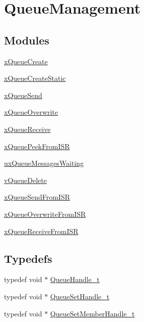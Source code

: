 \hypertarget{group___queue_management}{}\section{Queue\+Management}
\label{group___queue_management}
\subsection*{Modules}
\begin{DoxyCompactItemize}
\item 
\hyperlink{group__x_queue_create}{x\+Queue\+Create}
\item 
\hyperlink{group__x_queue_create_static}{x\+Queue\+Create\+Static}
\item 
\hyperlink{group__x_queue_send}{x\+Queue\+Send}
\item 
\hyperlink{group__x_queue_overwrite}{x\+Queue\+Overwrite}
\item 
\hyperlink{group__x_queue_receive}{x\+Queue\+Receive}
\item 
\hyperlink{group__x_queue_peek_from_i_s_r}{x\+Queue\+Peek\+From\+I\+SR}
\item 
\hyperlink{group__ux_queue_messages_waiting}{ux\+Queue\+Messages\+Waiting}
\item 
\hyperlink{group__v_queue_delete}{v\+Queue\+Delete}
\item 
\hyperlink{group__x_queue_send_from_i_s_r}{x\+Queue\+Send\+From\+I\+SR}
\item 
\hyperlink{group__x_queue_overwrite_from_i_s_r}{x\+Queue\+Overwrite\+From\+I\+SR}
\item 
\hyperlink{group__x_queue_receive_from_i_s_r}{x\+Queue\+Receive\+From\+I\+SR}
\end{DoxyCompactItemize}
\subsection*{Typedefs}
\begin{DoxyCompactItemize}
\item 
typedef void $\ast$ \hyperlink{group___queue_management_gaaf19d499892a4ce1409326ece00f5264}{Queue\+Handle\+\_\+t}
\item 
typedef void $\ast$ \hyperlink{group___queue_management_ga32a86d604e1706d72a5a4c62d8262f56}{Queue\+Set\+Handle\+\_\+t}
\item 
typedef void $\ast$ \hyperlink{group___queue_management_ga6c19a940d8fe07d338928ecea68b1776}{Queue\+Set\+Member\+Handle\+\_\+t}
\end{DoxyCompactItemize}


